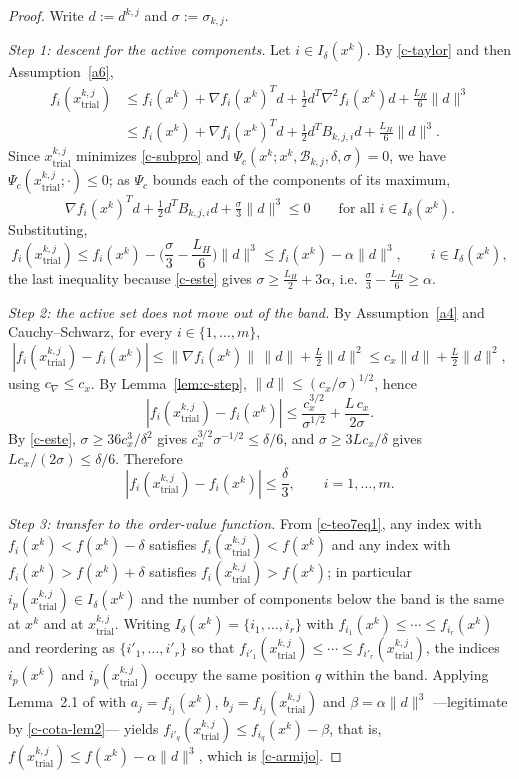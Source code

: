 \documentclass[11pt]{article}
\newcommand{\xkjtrial}{x^{k,j}_{\mathrm{trial}}}
\newcommand{\dkj}{d^{k,j}}
\begin{document}
\begin{proof}
Write $d := \dkj$ and $\sigma := \sigma_{k,j}$.

\emph{Step 1: descent for the active components.}
Let $i \in I_\delta(x^k)$. By \eqref{c-taylor} and then Assumption~\ref{a6},
\begin{align*}
f_i(\xkjtrial) &\leq f_i(x^k) + \nabla f_i(x^k)^Td
+ \tfrac{1}{2}d^T\nabla^2 f_i(x^k)d + \tfrac{L_H}{6}\|d\|^3 \\
&\leq f_i(x^k) + \nabla f_i(x^k)^Td + \tfrac{1}{2}d^TB_{k,j,i}d
+ \tfrac{L_H}{6}\|d\|^3 .
\end{align*}
Since $\xkjtrial$ minimizes \eqref{c-subpro} and
$\Psi_c(x^k; x^k,\mathcal{B}_{k,j},\delta,\sigma) = 0$, we have
$\Psi_c(\xkjtrial;\cdot) \leq 0$; as $\Psi_c$ bounds each of the components of
its maximum,
\[
\nabla f_i(x^k)^Td + \tfrac{1}{2}d^TB_{k,j,i}d + \tfrac{\sigma}{3}\|d\|^3
\leq 0 \qquad \text{for all } i \in I_\delta(x^k).
\]
Substituting,
\begin{equation} \label{c-cota-lem2}
f_i(\xkjtrial) \leq f_i(x^k)
- \Big( \frac{\sigma}{3} - \frac{L_H}{6} \Big)\|d\|^3
\leq f_i(x^k) - \alpha\|d\|^3, \qquad i \in I_\delta(x^k),
\end{equation}
the last inequality because \eqref{c-este} gives
$\sigma \geq \tfrac{L_H}{2} + 3\alpha$, i.e.\
$\tfrac{\sigma}{3} - \tfrac{L_H}{6} \geq \alpha$.

\emph{Step 2: the active set does not move out of the band.}
By Assumption~\ref{a4} and Cauchy--Schwarz, for every
$i \in \{1,\dots,m\}$,
\[
|f_i(\xkjtrial) - f_i(x^k)| \leq \|\nabla f_i(x^k)\|\,\|d\|
+ \tfrac{L}{2}\|d\|^2 \leq c_x\|d\| + \tfrac{L}{2}\|d\|^2 ,
\]
using $c_\nabla \leq c_x$. By Lemma~\ref{lem:c-step},
$\|d\| \leq (c_x/\sigma)^{1/2}$, hence
\[
|f_i(\xkjtrial) - f_i(x^k)| \leq \frac{c_x^{3/2}}{\sigma^{1/2}}
+ \frac{L\,c_x}{2\sigma} .
\]
By \eqref{c-este}, $\sigma \geq 36c_x^3/\delta^2$ gives
$c_x^{3/2}\sigma^{-1/2} \leq \delta/6$, and $\sigma \geq 3Lc_x/\delta$ gives
$Lc_x/(2\sigma) \leq \delta/6$. Therefore
\begin{equation} \label{c-teo7eq1}
|f_i(\xkjtrial) - f_i(x^k)| \leq \frac{\delta}{3}, \qquad i = 1,\dots,m .
\end{equation}

\emph{Step 3: transfer to the order-value function.}
From \eqref{c-teo7eq1}, any index with $f_i(x^k) < f(x^k) - \delta$ satisfies
$f_i(\xkjtrial) < f(x^k)$ and any index with $f_i(x^k) > f(x^k) + \delta$
satisfies $f_i(\xkjtrial) > f(x^k)$; in particular
$i_p(\xkjtrial) \in I_\delta(x^k)$ and the number of components below the band
is the same at $x^k$ and at $\xkjtrial$. Writing
$I_\delta(x^k) = \{i_1,\dots,i_r\}$ with
$f_{i_1}(x^k) \leq \cdots \leq f_{i_r}(x^k)$ and reordering as
$\{i'_1,\dots,i'_r\}$ so that
$f_{i'_1}(\xkjtrial) \leq \cdots \leq f_{i'_r}(\xkjtrial)$, the indices
$i_p(x^k)$ and $i_p(\xkjtrial)$ occupy the same position $q$ within the band.
Applying Lemma~2.1 of \cite{dunder1} with $a_j = f_{i_j}(x^k)$,
$b_j = f_{i_j}(\xkjtrial)$ and $\beta = \alpha\|d\|^3$ ---legitimate by
\eqref{c-cota-lem2}--- yields
$f_{i'_q}(\xkjtrial) \leq f_{i_q}(x^k) - \beta$, that is,
$f(\xkjtrial) \leq f(x^k) - \alpha\|d\|^3$, which is \eqref{c-armijo}.
\end{proof}
\end{document}
